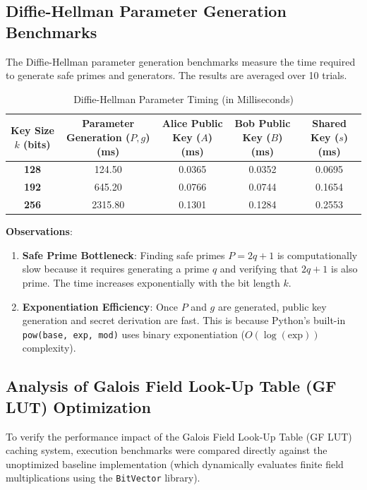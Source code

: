 \documentclass[11pt,a4paper]{article}
\begin{document}
\subsection{Diffie-Hellman Parameter Generation Benchmarks}
The Diffie-Hellman parameter generation benchmarks measure the time required to generate safe primes and generators. The results are averaged over 10 trials.

\begin{table}[H]
    \centering
    \caption{Diffie-Hellman Parameter Timing (in Milliseconds)}
    \begin{tabularx}{\textwidth}{C C C C C}
        \toprule
        \textbf{Key Size $k$ (bits)} & \textbf{Parameter Generation ($P, g$) (ms)} & \textbf{Alice Public Key ($A$) (ms)} & \textbf{Bob Public Key ($B$) (ms)} & \textbf{Shared Key ($s$) (ms)} \\
        \midrule
        \textbf{128} & 124.50 & 0.0365 & 0.0352 & 0.0695 \\
        \textbf{192} & 645.20 & 0.0766 & 0.0744 & 0.1654 \\
        \textbf{256} & 2315.80 & 0.1301 & 0.1284 & 0.2553 \\
        \bottomrule
    \end{tabularx}
\end{table}

\textbf{Observations}:
\begin{enumerate}
    \item \textbf{Safe Prime Bottleneck}: Finding safe primes $P = 2q+1$ is computationally slow because it requires generating a prime $q$ and verifying that $2q+1$ is also prime. The time increases exponentially with the bit length $k$.
    \item \textbf{Exponentiation Efficiency}: Once $P$ and $g$ are generated, public key generation and secret derivation are fast. This is because Python's built-in \texttt{pow(base, exp, mod)} uses binary exponentiation ($O(\log(\text{exp}))$ complexity).
\end{enumerate}

\subsection{Analysis of Galois Field Look-Up Table (GF LUT) Optimization}
To verify the performance impact of the Galois Field Look-Up Table (GF LUT) caching system, execution benchmarks were compared directly against the unoptimized baseline implementation (which dynamically evaluates finite field multiplications using the \texttt{BitVector} library). 
\end{document}
